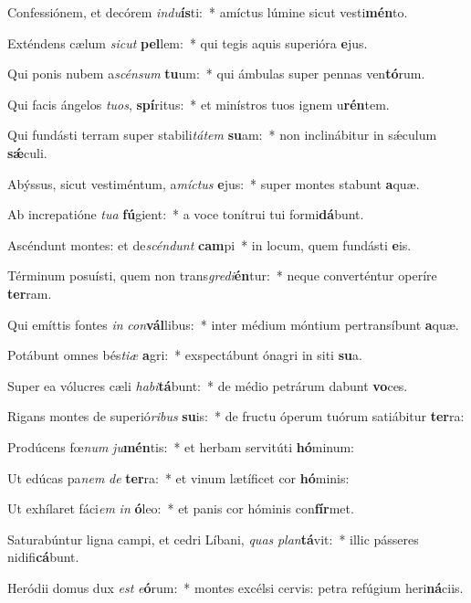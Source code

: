 \item Confessiónem, et decórem \textit{ind}\textit{u}\textbf{ís}ti:~* amíctus lúmine sicut vesti\textbf{mén}to.
\item Exténdens cælum \textit{sic}\textit{ut} \textbf{pel}lem:~* qui tegis aquis superióra \textbf{e}jus.
\item Qui ponis nubem a\textit{scén}\textit{sum} \textbf{tu}um:~* qui ámbulas super pennas ven\textbf{tó}rum.
\item Qui facis ángelos \textit{tu}\textit{os}, \textbf{spí}ritus:~* et minístros tuos ignem u\textbf{rén}tem.
\item Qui fundásti terram super stabili\textit{tá}\textit{tem} \textbf{su}am:~* non inclinábitur in sǽculum \textbf{sǽ}culi.
\item Abýssus, sicut vestiméntum, a\textit{míc}\textit{tus} \textbf{e}jus:~* super montes stabunt \textbf{a}quæ.
\item Ab increpatióne \textit{tu}\textit{a} \textbf{fú}gient:~* a voce tonítrui tui formi\textbf{dá}bunt.
\item Ascéndunt montes: et de\textit{scén}\textit{dunt} \textbf{cam}pi~* in locum, quem fundásti \textbf{e}is.
\item Términum posuísti, quem non trans\textit{gre}\textit{di}\textbf{én}tur:~* neque converténtur operíre \textbf{ter}ram.
\item Qui emíttis fontes \textit{in} \textit{con}\textbf{vál}libus:~* inter médium móntium pertransíbunt \textbf{a}quæ.
\item Potábunt omnes bés\textit{ti}\textit{æ} \textbf{a}gri:~* exspectábunt ónagri in siti \textbf{su}a.
\item Super ea vólucres cæli \textit{ha}\textit{bi}\textbf{tá}bunt:~* de médio petrárum dabunt \textbf{vo}ces.
\item Rigans montes de superió\textit{ri}\textit{bus} \textbf{su}is:~* de fructu óperum tuórum satiábitur \textbf{ter}ra:
\item Prodúcens fœ\textit{num} \textit{ju}\textbf{mén}tis:~* et herbam servitúti \textbf{hó}minum:
\item Ut edúcas pa\textit{nem} \textit{de} \textbf{ter}ra:~* et vinum lætíficet cor \textbf{hó}minis:
\item Ut exhílaret fáci\textit{em} \textit{in} \textbf{ó}leo:~* et panis cor hóminis con\textbf{fír}met.
\item Saturabúntur ligna campi, et cedri Líbani, \textit{quas} \textit{plan}\textbf{tá}vit:~* illic pásseres nidifi\textbf{cá}bunt.
\item Heródii domus dux \textit{est} \textit{e}\textbf{ó}rum:~* montes excélsi cervis: petra refúgium heri\textbf{ná}ciis.
